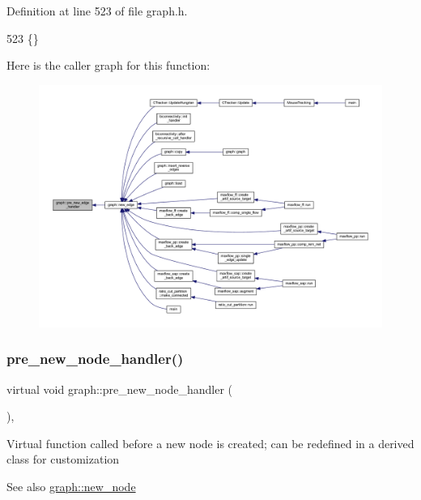 Definition at line 523 of file graph.\+h.


\begin{DoxyCode}
523 \{\}    
\end{DoxyCode}
Here is the caller graph for this function\+:
\nopagebreak
\begin{figure}[H]
\begin{center}
\leavevmode
\includegraphics[width=350pt]{classgraph_a0a7a68fa0baa47ef955525c445fa1a04_icgraph}
\end{center}
\end{figure}
\mbox{\label{classgraph_afb7606eaa8d673b6599af24437c0546c}} 
\subsubsection{\texorpdfstring{pre\+\_\+new\+\_\+node\+\_\+handler()}{pre\_new\_node\_handler()}}
{\footnotesize\ttfamily virtual void graph\+::pre\+\_\+new\+\_\+node\+\_\+handler (\begin{DoxyParamCaption}{ }\end{DoxyParamCaption})\hspace{0.3cm}{\ttfamily [inline]}, {\ttfamily [virtual]}}

Virtual function called before a new node is created; can be redefined in a derived class for customization

\begin{DoxySeeAlso}{See also}
\mbox{\hyperlink{classgraph_ab9505335c20558319b6cce25aed23524}{graph\+::new\+\_\+node}} 
\end{DoxySeeAlso}


